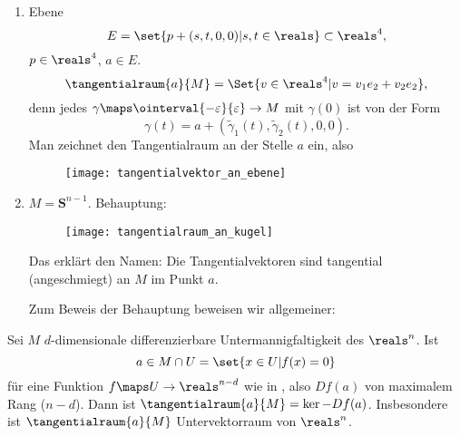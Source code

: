 \begin{beispiele*}
  \begin{enumerate}
    \item Ebene
    \begin{equation*}
      E=\set{p+(s,t,0,0)|s,t\in \reals}\subset \reals^4,
    \end{equation*}
    \( p\in \reals^4 \), \( a\in E \).
    \begin{equation*}
      \tangentialraum{a}{M}=\Set{v\in \reals^4|v=v_1e_2+v_2e_2},
    \end{equation*}
    denn jedes \( \gamma\maps \ointerval{-\varepsilon}{\varepsilon}\to M \) mit \( \gamma(0) \) ist von der Form
    \begin{equation*}
      \gamma(t)=a+(\tilde{\gamma}_1(t),\tilde{\gamma}_2(t),0,0).
    \end{equation*}
    Man zeichnet den Tangentialraum an der Stelle \( a \) ein, also
    \begin{figure}[H]
      \centering
      \texttt{[image: tangentialvektor\_an\_ebene]}
      \label{fig:tangentialvektor_an_ebene}
    \end{figure}
    \item \( M=\mathbf{S}^{n-1} \). Behauptung: 
    \begin{figure}[H]
      \centering
      \texttt{[image: tangentialraum\_an\_kugel]}
      \label{fig:tangentialraum_an_kugel}
    \end{figure}
    Das erklärt den Namen: Die Tangentialvektoren sind tangential (angeschmiegt) an \( M \) im Punkt \( a \).
    
    Zum Beweis der Behauptung beweisen wir allgemeiner:
  \end{enumerate}
\end{beispiele*}
\begin{satz}\label{tangentialraum_ist_tangential}
  Sei \( M \) \( d \)-dimensionale differenzierbare Untermannigfaltigkeit des \( \reals^n \). Ist 
  \begin{equation*}
    a\in M\cap U =\set{x\in U |f(x)=0}
  \end{equation*}
  für eine Funktion \( f\maps U\to \reals^{n-d} \) wie in , also \( Df(a) \) von maximalem Rang (\( n-d \)). Dann ist \( \tangentialraum{a}{M}=\ker-{Df(a)} \). Insbesondere ist \( \tangentialraum{a}{M} \) Untervektorraum von \( \reals^n \).
\end{satz}
